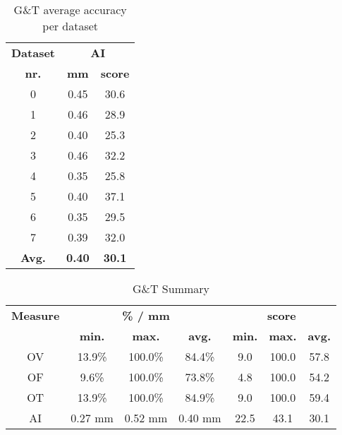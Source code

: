 \begin{table*}[h]
\scriptsize
\caption{G\&T average accuracy per dataset}
\centering
\begin{tabular}{|c|cc|}
\hline
\multicolumn{1}{|c|}{\textbf{Dataset}} &\multicolumn{2}{c|}{\textbf{AI}}\\
\multicolumn{1}{|c|}{\textbf{nr.}} &\multicolumn{1}{c|}{\textbf{mm}} &\multicolumn{1}{c|}{\textbf{score}}\\
\hline
0&0.45&30.6\\
1&0.46&28.9\\
2&0.40&25.3\\
3&0.46&32.2\\
4&0.35&25.8\\
5&0.40&37.1\\
6&0.35&29.5\\
7&0.39&32.0\\
\hline
\textbf{Avg.}&\textbf{0.40}&\textbf{30.1}\\
\hline
\end{tabular}
\vspace{-0.3cm}
\label{tb:tb_4_5}
\normalsize
\end{table*}

\begin{table*}[h]
\scriptsize
\caption{G\&T Summary}
\centering
\begin{tabular}{|c|ccc|ccc|}
\hline
\multicolumn{1}{|c|}{\textbf{Measure}} &\multicolumn{3}{c|}{\textbf{\% / mm}} &\multicolumn{3}{c|}{\textbf{score}}  \\
\multicolumn{1}{|c|}{\textbf{}} &\multicolumn{1}{c|}{\textbf{min.}} &\multicolumn{1}{c|}{\textbf{max.}} &\multicolumn{1}{c|}{\textbf{avg.}} &\multicolumn{1}{c|}{\textbf{min.}} &\multicolumn{1}{c|}{\textbf{max.}} &\multicolumn{1}{c|}{\textbf{avg.}}\\
\hline
OV&13.9\%&100.0\%&84.4\%& 9.0&100.0&57.8\\
OF& 9.6\%&100.0\%&73.8\%& 4.8&100.0&54.2\\
OT&13.9\%&100.0\%&84.9\%& 9.0&100.0&59.4\\
AI&0.27 mm&0.52 mm&0.40 mm&22.5&43.1&30.1\\
\hline
\end{tabular}
\vspace{-0.3cm}
\label{tb:tb_4_6}
\normalsize
\end{table*}

